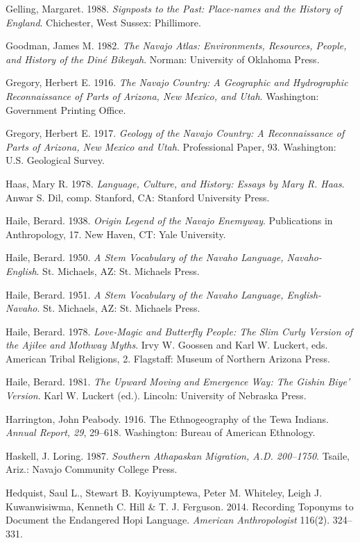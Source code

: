 \begin{hang}
	Gelling, Margaret. 1988. \textit{Signposts to the Past: Place-names and the History of England}.  Chichester, West Sussex:  Phillimore.

	Goodman, James M.  1982. \textit{The Navajo Atlas: Environments, Resources, People, and History of the Diné Bikeyah}.  Norman:  University of Oklahoma Press.

	Gregory, Herbert E.  1916. \textit{The Navajo Country: A Geographic and Hydrographic Reconnaissance of Parts of Arizona, New Mexico, and Utah}.  Washington:  Government Printing Office.

	Gregory, Herbert E. 1917.  \textit{Geology of the Navajo Country: A Reconnaissance of Parts of Arizona, New Mexico and Utah}.  Professional Paper, 93.  Washington:  U.S. Geological Survey.

	Haas, Mary R.  1978. \textit{Language, Culture, and History: Essays by Mary R. Haas}.  Anwar S. Dil, comp.  Stanford, CA:  Stanford University Press.

	Haile, Berard. 1938. \textit{\textit{Origin Legend of the Navajo Enemyway}}.  Publications in Anthropology, 17.  New Haven, CT:  Yale University.

	Haile, Berard. 1950. \textit{A Stem Vocabulary of the Navaho Language, Navaho-English}.  St. Michaels, AZ:  St. Michaels Press.

	Haile, Berard. 1951. \textit{A Stem Vocabulary of the Navaho Language, English-Navaho}.  St. Michaels, AZ:  St. Michaels Press.

	Haile, Berard. 1978. \textit{Love-Magic and Butterfly People: The Slim Curly Version of the Ajiłee and Mothway Myths}.  Irvy W. Goossen and Karl W. Luckert, eds.  American Tribal Religions, 2.  Flagstaff:  Museum of Northern Arizona Press.

	Haile, Berard. 1981. \textit{The Upward Moving and Emergence Way: The Gishin Biye’ Version}.  Karl W. Luckert (ed.). Lincoln:  University of Nebraska Press.

	Harrington, John Peabody. 1916.  The Ethnogeography of the Tewa Indians.  \textit{Annual Report, 29},  29--618.  Washington:  Bureau of American Ethnology.

	Haskell, J. Loring. 1987. \textit{Southern Athapaskan Migration, A.D. 200--1750}.  Tsaile, Ariz.:  Navajo Community College Press.

	Hedquist, Saul L., Stewart B. Koyiyumptewa, Peter M. Whiteley, Leigh J. Kuwanwisiwma, Kenneth C. Hill \& T. J. Ferguson. 2014.  Recording Toponyms to Document the Endangered Hopi Language.  \textit{American Anthropologist} 116(2). 324--331.


\end{hang}
